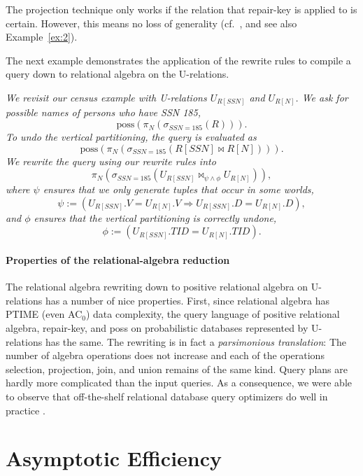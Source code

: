 The projection technique only works if the relation that repair-key is applied to is certain.
However, this means no loss of generality (cf.\ \cite{Koch2008-SO}, and see also Example~\ref{ex:2}).

The next example demonstrates the application of the rewrite rules to compile a query down to relational algebra on the U-relations.


\begin{example}\em
\label{ex:proc_urel}
We revisit our census example with U-relations $U_{R[SSN]}$ and $U_{R[N]}$.
We ask for possible names of persons who have SSN 185,
\[
\mbox{poss}(\pi_N(\sigma_{SSN=185}(R))).
\]
To undo the vertical partitioning, the query
is evaluated as
\[
\mbox{poss}(\pi_N(\sigma_{SSN=185}(R[SSN] \bowtie R[N]))).
\]
We rewrite the query using our rewrite rules into
\[
\pi_N(\sigma_{SSN=185}(U_{R[SSN]}
   \bowtie_{\psi\wedge\phi} U_{R[N]})),
\]
where
$\psi$ ensures that we only generate tuples that occur in some worlds,
\[
\psi := (U_{R[SSN]}.V = U_{R[N]}.V \Rightarrow
    U_{R[SSN]}.D=U_{R[N]}.D),
\]
and $\phi$ ensures that the vertical partitioning is correctly undone,
\[
\phi := (U_{R[SSN]}.TID = U_{R[N]}.TID).
\]

\vspace{-5mm}

\punto
\end{example}



\paragraph{Properties of the relational-algebra reduction}
The relational algebra rewriting down to positive relational algebra on U-relations has
a number of nice properties. First, since relational algebra has PTIME (even AC$_0$) data complexity, the query language of positive relational algebra, repair-key, and poss on probabilistic databases represented by U-relations has the same.
The rewriting is in fact a {\em parsimonious translation}\/: The number of algebra operations does not increase and each of the operations selection, projection, join, and union remains of the same kind. Query plans are hardly more complicated than
the input queries. As a consequence, we were able to observe that off-the-shelf relational database query optimizers
do well in practice \cite{AJKO2008}.



\section{Asymptotic Efficiency}


